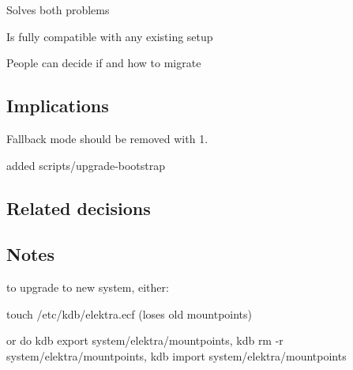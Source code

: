 \begin{DoxyItemize}
\item Solves both problems
\item Is fully compatible with any existing setup
\item People can decide if and how to migrate
\end{DoxyItemize}

\subsection*{Implications}


\begin{DoxyItemize}
\item Fallback mode should be removed with 1.
\item added scripts/upgrade-\/bootstrap
\end{DoxyItemize}

\subsection*{Related decisions}

\subsection*{Notes}

to upgrade to new system, either\+:


\begin{DoxyItemize}
\item touch /etc/kdb/elektra.ecf (loses old mountpoints)
\item or do kdb export system/elektra/mountpoints, kdb rm -\/r system/elektra/mountpoints, kdb import system/elektra/mountpoints 
\end{DoxyItemize}